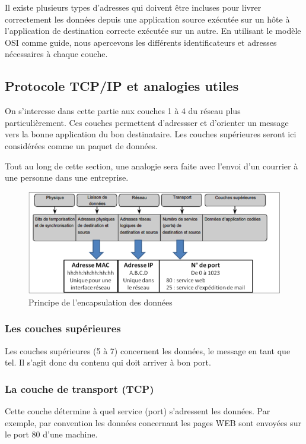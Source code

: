 \documentclass[11pt]{article}
\begin{document}
Il existe plusieurs types d'adresses qui doivent être incluses pour livrer correctement les données depuis une application source exécutée sur un hôte à l'application de destination correcte exécutée sur un autre. En utilisant le modèle OSI comme guide, nous apercevons les différents identificateurs et adresses nécessaires à chaque couche.

\subsection{Protocole TCP/IP et analogies utiles}
On s'interesse dans cette partie aux couches 1 à 4 du réseau plus particulièrement. Ces couches permettent d'adressser et d'orienter un message vers la bonne application du bon destinataire. Les couches supérieures seront ici considérées comme un paquet de données.

Tout au long de cette section, une analogie sera faite avec l'envoi d'un courrier à une personne dans une entreprise.

\begin{figure}[h!t]
  \centering
  \includegraphics[width=.7\textwidth]{Src/Images/reseau_couches_adressage}
  \caption{Principe de l'encapsulation des données}
  \label{fig:res_encap_generique}
\end{figure}

\subsubsection{Les couches supérieures}
Les couches supérieures (5 à 7) concernent les données, le message en tant que tel. Il s'agit donc {du contenu qui doit arriver à bon port.}

\subsubsection{La couche de transport (TCP)}
Cette couche détermine à quel service (port) {s'adressent les données}. Par exemple, par convention les données concernant les pages WEB sont envoyées sur le port 80 d'une machine.
\end{document}
